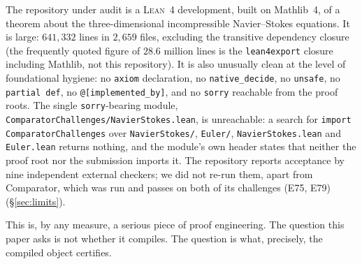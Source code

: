 \documentclass[11pt]{article}
\newcommand{\ct}[1]{\texttt{#1}}
\newcommand{\Lean}{\textsc{Lean}}
\newcommand{\file}[1]{\texttt{\small #1}}
\theoremstyle{plain}
\theoremstyle{definition}
\theoremstyle{remark}
\begin{document}
The repository under audit is a \Lean{}~4 development, built on Mathlib~4, of a
theorem about the three-dimensional incompressible Navier--Stokes equations. It
is large: $641{,}332$ lines in $2{,}659$ files, excluding the transitive
dependency closure (the frequently quoted figure of $28.6$ million lines is the
\ct{lean4export} closure including Mathlib, not this repository). It is also
unusually clean at the level of foundational hygiene: no \ct{axiom} declaration,
no \ct{native\_decide}, no \ct{unsafe}, no \ct{partial def}, no
\ct{@[implemented\_by]}, and no \ct{sorry} reachable from the proof roots. The
single \ct{sorry}-bearing module, \file{ComparatorChallenges/NavierStokes.lean},
is unreachable: a search for \ct{import ComparatorChallenges} over
\file{NavierStokes/}, \file{Euler/}, \file{NavierStokes.lean} and
\file{Euler.lean} returns nothing, and the module's own header states that
neither the proof root nor the submission imports it. The repository reports
acceptance by nine independent external checkers; we did not re-run them, apart from Comparator, which was run and passes on both of its challenges (E75, E79)
(\S\ref{sec:limits}).

This is, by any measure, a serious piece of proof engineering. The question this
paper asks is not whether it compiles. The question is what, precisely, the
compiled object certifies.
\end{document}
